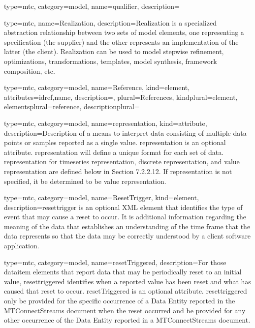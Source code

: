 {
  type=mtc,
  category=model,
  name={qualifier},
  description={}
}


{
  type=mtc,
  name={Realization},
  description={Realization is a specialized abstraction relationship between two sets of model elements, one representing a specification (the supplier) and the other represents an implementation of the latter (the client). Realization can be used to model stepwise refinement, optimizations, transformations, templates, model synthesis, framework composition, etc.}
}


{
  type=mtc,
  category=model,
  name={Reference},
  kind={element},
  attributes={\gls{idref},\gls{name}},
  description={},
  plural={References},
  kindplural={element},
  elementsplural={\gls{reference}},
  descriptionplural={}
}


{
  type=mtc,
  category=model,
  name={representation},
  kind={attribute},
  description={Description of a means to interpret data consisting of multiple data points or samples reported as a single value.  \newline \gls{representation} is an optional attribute.  \newline \gls{representation} will define a unique format for each set of data.  \newline \gls{representation} for \gls{timeseries representation}, \gls{discrete representation}, and \gls{value representation} are defined below in Section {\color{red} 7.2.2.12}.  \newline If \gls{representation} is not specified, it \MUST be determined to be \gls{value representation}.}
}


{
  type=mtc,
  category=model,
  name={ResetTrigger},
  kind={element},
  description={\gls{resettrigger} is an optional XML element that identifies the type of event that may cause a reset to occur. It is additional information regarding the meaning of the data that establishes an understanding of the time frame that the data represents so that the data may be correctly understood by a client software application.}
}


{
  type=mtc,
  category=model,
  name={resetTriggered},
  description={For those \gls{dataitem} elements that report data that may be periodically reset to an initial value, \gls{resettriggered} identifies when a reported value has been reset and what has caused that reset to occur.  \newline resetTriggered is an optional attribute.  \newline \gls{resettriggered} \MUST only be provided for the specific occurrence of a Data Entity reported in the MTConnectStreams document when the reset occurred and \MUSTNOT be provided for any other occurrence of the Data Entity reported in a MTConnectStreams document.}
}


